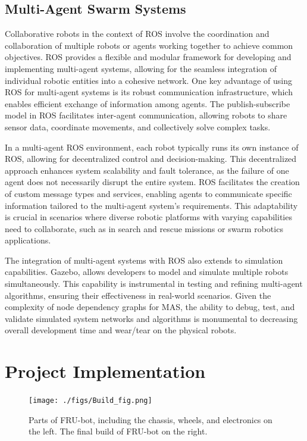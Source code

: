 \documentclass[conference]{IEEEtran}
\begin{document}
\subsection{Multi-Agent Swarm Systems}
Collaborative robots in the context of ROS involve the coordination and collaboration of multiple robots or agents working together to achieve common objectives. ROS provides a flexible and modular framework for developing and implementing multi-agent systems, allowing for the seamless integration of individual robotic entities into a cohesive network. One key advantage of using ROS for multi-agent systems is its robust communication infrastructure, which enables efficient exchange of information among agents. The publish-subscribe model in ROS facilitates inter-agent communication, allowing robots to share sensor data, coordinate movements, and collectively solve complex tasks.

In a multi-agent ROS environment, each robot typically runs its own instance of ROS, allowing for decentralized control and decision-making. This decentralized approach enhances system scalability and fault tolerance, as the failure of one agent does not necessarily disrupt the entire system. ROS facilitates the creation of custom message types and services, enabling agents to communicate specific information tailored to the multi-agent system's requirements. This adaptability is crucial in scenarios where diverse robotic platforms with varying capabilities need to collaborate, such as in search and rescue missions or swarm robotics applications.

The integration of multi-agent systems with ROS also extends to simulation capabilities. Gazebo, allows developers to model and simulate multiple robots simultaneously. This capability is instrumental in testing and refining multi-agent algorithms, ensuring their effectiveness in real-world scenarios. Given the complexity of node dependency graphs for MAS, the ability to debug, test, and validate simulated system networks and algorithms is monumental to decreasing overall development time and wear/tear on the physical robots. 
\section{Project Implementation}
\begin{figure}
	\texttt{[image: ./figs/Build\_fig.png]}
	\caption{Parts of FRU-bot, including the chassis, wheels, and electronics on the left. The final build of FRU-bot on the right.}
\end{figure}
\end{document}
